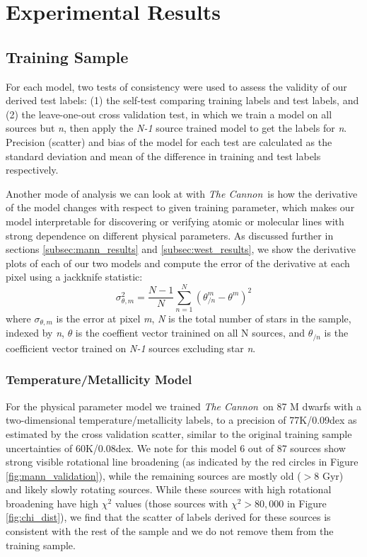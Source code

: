 \documentclass[modern]{aastex62}
\newcommand{\thecannon}{\textsl{The Cannon}}
\begin{document}
\section{Experimental Results} \label{sec:results}

\subsection{Training Sample}

For each model, two tests of consistency were used to assess the validity of our derived test labels: (1) the self-test comparing training labels and test labels, and (2) the leave-one-out cross validation test, in which we train a model on all sources but \emph{n}, then apply the \emph{N-1} source trained model to get the labels for \emph{n}. Precision (scatter) and bias of the model for each test are calculated as the standard deviation and mean of the difference in training and test labels respectively.

Another mode of analysis we can look at with \thecannon\ is how the derivative of the model changes with respect to given training parameter, which makes our model interpretable for discovering or verifying atomic or molecular lines with strong dependence on different physical parameters. As discussed further in sections \ref{subsec:mann_results} and \ref{subsec:west_results}, we show the derivative plots of each of our two models and compute the error of the derivative at each pixel using a jackknife statistic:
\begin{equation}
	\sigma_{\theta,m}^2 = \frac{N-1}{N} \sum^N_{n=1} (\theta_{/n}^m - \theta^m)^2 
\end{equation}
where $\sigma_{\theta,m}$ is the error at pixel \emph{m}, \emph{N} is the total number of stars in the sample, indexed by \emph{n}, $\theta$ is the coeffient vector trainined on all N sources, and $\theta_{/n}$ is the coefficient vector trained on \emph{N-1} sources excluding star \emph{n}.


\subsubsection{Temperature/Metallicity Model \label{subsec:mann_results}}
For the physical parameter model we trained \thecannon\ on 87 M dwarfs with a two-dimensional temperature/metallicity labels, to a precision of 77K/0.09dex as estimated by the cross validation scatter, similar to the original training sample uncertainties of 60K/0.08dex. We note for this model 6 out of 87 sources show strong visible rotational line broadening (as indicated by the red circles in Figure \ref{fig:mann_validation}), while the remaining sources are mostly old ($>8$ Gyr) and likely slowly rotating sources. While these sources with high rotational broadening have high $\chi^2$ values (those sources with $\chi^2 > 80,000$ in Figure \ref{fig:chi_dist}), we find that the scatter of labels derived for these sources is consistent with the rest of the sample and we do not remove them from the training sample.
\end{document}
